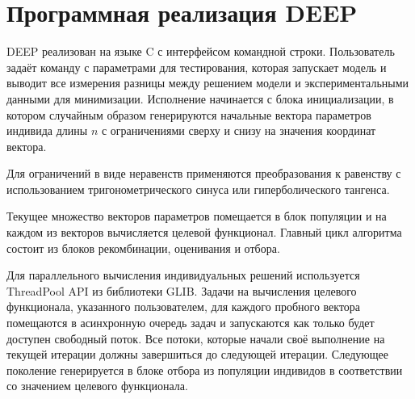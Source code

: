 \section*{Программная реализация DEEP}

DEEP реализован на языке C с интерфейсом командной строки.
Пользователь задаёт команду с параметрами для тестирования,
которая запускает модель и выводит все измерения
разницы между решением модели
и экспериментальными данными для минимизации.
Исполнение начинается с блока инициализации,
в котором случайным образом генерируются
начальные вектора параметров индивида
длины \begin{math}n\end{math}
с ограничениями сверху и снизу
на значения координат вектора.

Для ограничений в виде неравенств
применяются преобразования к равенству
с использованием тригонометрического синуса
или гиперболического тангенса\cite{KozlovIjbra}.

Текущее множество векторов параметров помещается
в блок популяции и на каждом из векторов
вычисляется целевой функционал.
Главный цикл алгоритма состоит из блоков
рекомбинации, оценивания и отбора.

Для параллельного вычисления индивидуальных решений
используется ThreadPool API из библиотеки GLIB.
Задачи на вычисления целевого функционала,
указанного пользователем,
для каждого пробного вектора
помещаются в асинхронную очередь задач
и запускаются как только будет доступен свободный поток. 
Все потоки, которые начали своё выполнение
на текущей итерации должны завершиться
до следующей итерации.
Следующее поколение генерируется в блоке отбора
из популяции индивидов в соответствии
со значением целевого функционала.

